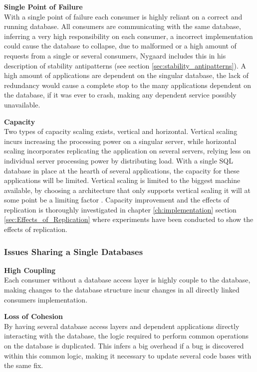 \textbf{Single Point of Failure}\\
With a single point of failure each consumer is highly reliant on a correct and running database. All consumers are communicating with the same database, inferring a very high responsibility on each consumer, a incorrect implementation could cause the database to collapse, due to malformed or a high amount of requests from a single or several consumers, Nygaard includes this in his description of stability antipatterns \cite[p. 31]{nygard2007release}  (see section \ref{sec:stability_antipatterns}).
A high amount of applications are dependent on the singular database, the lack of redundancy would cause a complete stop to the many applications dependent on the database, if it was ever to crash, making any dependent service possibly unavailable.

\textbf{Capacity}\\
Two types of capacity scaling exists, vertical and horizontal. Vertical scaling incurs increasing the processing power on a singular server, while horizontal scaling incorporates replicating the application on several servers, relying less on individual server processing power by distributing load. With a single SQL database in place at the hearth of several applications, the capacity for these applications will be limited. Vertical scaling is limited to the biggest machine available, by choosing a architecture that only supports vertical scaling it will at some point be a limiting factor \cite[t.~08:30]{meshenberg2016microservices}.
Capacity improvement and the effects of replication is thoroughly investigated in chapter \ref{ch:implementation} section \ref{sec:Effects_of_Replication} where experiments have been conducted to show the effects of replication.

\subsubsection{Issues Sharing a Single Databases}

\textbf{High Coupling}\\
Each consumer without a database access layer is highly couple to the database, making changes to the database structure incur changes in all directly linked consumers implementation.

\textbf{Loss of Cohesion}\\
By having several database access layers and dependent applications directly interacting with the database, the logic required to perform common operations on the database is duplicated. This infers a big overhead if a bug is discovered within this common logic, making it necessary to update several code bases with the same fix.

